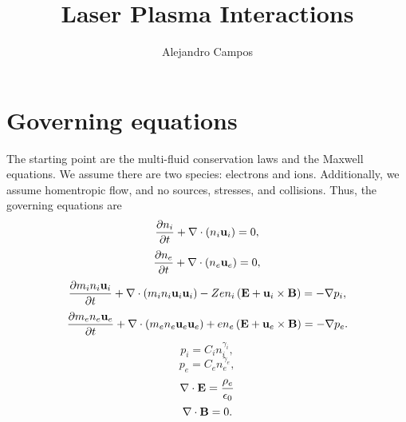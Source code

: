 \documentclass[a4paper,11pt]{report}
\title{Laser Plasma Interactions}
\author{Alejandro Campos}
\begin{document}
\maketitle
\tableofcontents

\chapter{Governing equations}
The starting point are the multi-fluid conservation laws and the Maxwell equations. We assume there are two species: electrons and ions. Additionally, we assume homentropic flow, and no sources, stresses, and collisions. Thus, the governing equations are
\begin{equation}
    \label{eq:pwaves_ion_density}
    \frac{\partial n_i}{\partial t} + \nabla \cdot \left (n_i \mathbf{u}_i \right ) = 0,
\end{equation}
\begin{equation}
    \label{eq:pwaves_electron_density}
    \frac{\partial n_e}{\partial t} + \nabla \cdot \left (n_e \mathbf{u}_e \right ) = 0,
\end{equation}
\begin{equation}
    \label{eq:pwaves_ion_momentum}
    \frac{\partial m_i n_i \mathbf{u}_i}{\partial t} + \nabla \cdot \left ( m_i n_i \mathbf{u}_i \mathbf{u}_i \right ) - Ze n_i \left ( \mathbf{E} + \mathbf{u}_i \times \mathbf{B} \right ) = -\nabla p_i,
\end{equation}
\begin{equation}
    \label{eq:pwaves_electron_momentum}
    \frac{\partial m_e n_e \mathbf{u}_e}{\partial t} + \nabla \cdot \left ( m_e n_e \mathbf{u}_e \mathbf{u}_e \right ) + e n_e \left ( \mathbf{E} + \mathbf{u}_e \times \mathbf{B} \right ) = -\nabla p_e.
\end{equation}
\begin{equation}
    p_i = C_i n_i^{\gamma_i},
\end{equation}
\begin{equation}
    p_e = C_e n_e^{\gamma_e},
\end{equation}
\begin{equation}
    \label{eq:pwaves_maxwell_3}
    \nabla \cdot \mathbf{E} = \frac{\rho_e}{\epsilon_0} 
\end{equation}
\begin{equation}
    \label{eq:p_waves_maxwell_4}
    \nabla \cdot \mathbf{B} = 0.
\end{equation}
\end{document}
